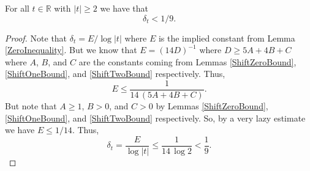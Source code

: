 \begin{theorem}[DeltaRange]
\label{DeltaRange}
\leanok
For all $t\in\mathbb{R}$ with $|t|\geq 2$ we have that $$\delta_t<1/9.$$
\end{theorem}
\begin{proof}
\leanok
Note that $\delta_t=E/\log|t|$ where $E$ is the implied constant from
    Lemma \ref{ZeroInequality}. But we know that $E=(14D)^{-1}$ where $D\geq 5A+4B+C$
    where $A$, $B$, and $C$ are the constants coming from
    Lemmas \ref{ShiftZeroBound}, \ref{ShiftOneBound}, and \ref{ShiftTwoBound} respectively. Thus,
    $$E\leq\frac{1}{14\,(5A+4B+C)}.$$
    But note that $A\geq 1$, $B>0$, and $C>0$ by Lemmas \ref{ShiftZeroBound}, \ref{ShiftOneBound},
    and \ref{ShiftTwoBound} respectively. So, by a very lazy estimate we have $E\leq 1/14$. Thus,
    $$\delta_t=\frac{E}{\log|t|}\leq\frac{1}{14\,\log2}<\frac{1}{9}.$$
\end{proof}
